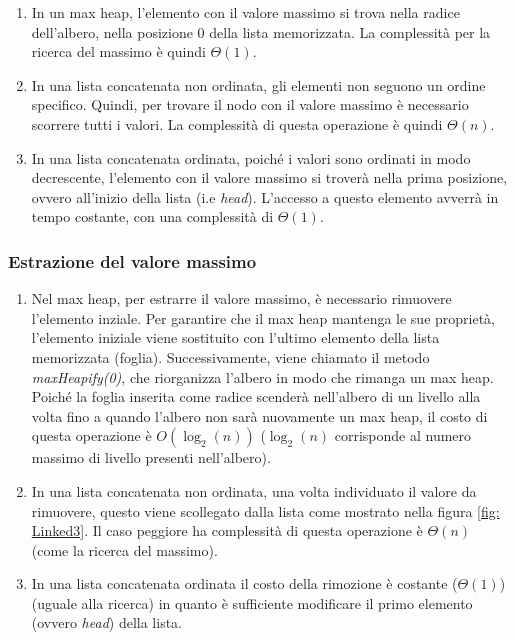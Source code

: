 \documentclass{article}
\begin{document}
    \begin{enumerate}
    
    \item In un max heap, l'elemento con il valore massimo si trova nella radice dell'albero, nella posizione $0$ della lista memorizzata. La complessità per la ricerca del massimo è quindi $\Theta(1)$.
    
    \item In una lista concatenata non ordinata, gli elementi non seguono un ordine specifico. Quindi, per trovare il nodo con il valore massimo è necessario scorrere tutti i valori. La complessità di questa operazione è quindi $\Theta(n)$.
    
    \item In una lista concatenata ordinata, poiché i valori sono ordinati in modo decrescente, l'elemento con il valore massimo si troverà nella prima posizione, ovvero all'inizio della lista (i.e \textit{head}). L'accesso a questo elemento avverrà in tempo costante, con una complessità di $\Theta(1)$.
    
    \end{enumerate}

\subsubsection{Estrazione del valore massimo}

    \begin{enumerate}
    
    \item Nel max heap, per estrarre il valore massimo, è necessario rimuovere l'elemento inziale. Per garantire che il max heap mantenga le sue proprietà, l'elemento iniziale viene sostituito con l'ultimo elemento della lista memorizzata (foglia). Successivamente, viene chiamato il metodo \textit{maxHeapify(0)}, che riorganizza l'albero in modo che rimanga un max heap. Poiché la foglia inserita come radice scenderà nell'albero di un livello alla volta fino a quando l'albero non sarà nuovamente un max heap, il costo di questa operazione è $O(\log_2(n))$ ($\log_2(n)$ corrisponde al numero massimo di livello presenti nell'albero).
    
    \item In una lista concatenata non ordinata, una volta individuato il valore da rimuovere, questo viene scollegato dalla lista come mostrato nella figura \ref{fig: Linked3}. Il caso peggiore ha complessità di questa operazione è $\Theta(n)$ (come la ricerca del massimo).
    
    \item In una lista concatenata ordinata il costo della rimozione è costante ($\Theta(1)$) (uguale alla ricerca) in quanto è sufficiente modificare il primo elemento (ovvero \textit{head}) della lista.
    
    \end{enumerate}
\end{document}
